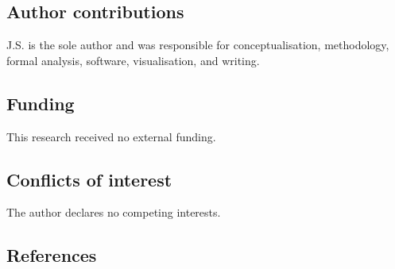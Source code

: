 \documentclass[
  11pt,
  letterpaper,
]{article}
\begin{document}
\subsection{Author contributions}\label{author-contributions}

J.S. is the sole author and was responsible for conceptualisation,
methodology, formal analysis, software, visualisation, and writing.

\subsection{Funding}\label{funding}

This research received no external funding.

\subsection{Conflicts of interest}\label{conflicts-of-interest}

The author declares no competing interests.

\subsection{References}\label{references}
\end{document}
